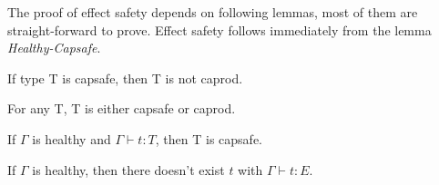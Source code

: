 The proof of effect safety depends on following lemmas, most of them
are straight-forward to prove. Effect safety follows immediately from
the lemma \emph{Healthy-Capsafe}.


\begin{lemma}
 If type T is capsafe, then T is not caprod.
\end{lemma}

\begin{lemma}
 For any T, T is either capsafe or caprod.
\end{lemma}



\begin{lemma}
  If $\Gamma$ is healthy and $\Gamma \vdash t : T$, then T is capsafe.
\end{lemma}

\begin{theorem}
  If $\Gamma$ is healthy, then there doesn't exist $t$ with
  $\Gamma \vdash t : E$.
\end{theorem}


